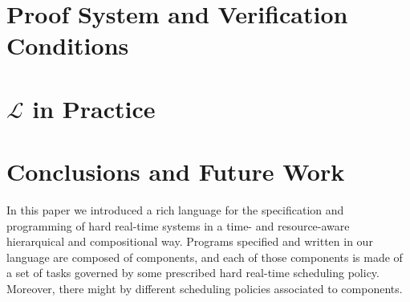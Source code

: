 \documentclass{llncs}
\begin{document}
\section{Proof System and Verification Conditions}

\section{$\mathcal{L}$ in Practice}

\section{Conclusions and Future Work}

In this paper we introduced a rich language for the specification and programming of hard real-time systems in a time- and resource-aware hierarquical and compositional way. Programs specified and written in our language are composed of components, and each of those components is made of a set of tasks governed by some prescribed hard real-time scheduling policy. Moreover, there might by different scheduling policies associated to components.
\end{document}
